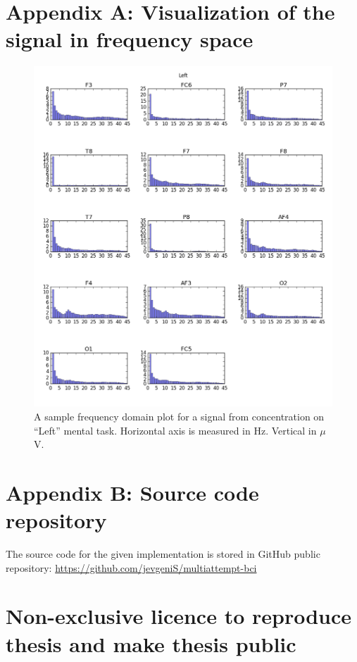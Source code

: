 \documentclass[12pt]{article}
\theoremstyle{definition}
\begin{document}
\section*{Appendix A: Visualization of the signal in frequency space}
\label{app:1}
\begin{figure} [H]
\begin{center}
\includegraphics[width=1\textwidth]{left_amplitudes}
\caption{A sample frequency domain plot for a signal from concentration on ``Left'' mental task. Horizontal axis is measured in Hz. Vertical in $\mu$V.}
\end{center}
\end{figure}

\newpage
\section*{Appendix B: Source code repository}
The source code for the given implementation is stored in GitHub public repository:
\url{https://github.com/jevgeniS/multiattempt-bci}

\pagebreak
\section*{\small Non-exclusive licence to reproduce thesis and make thesis public}
\end{document}
